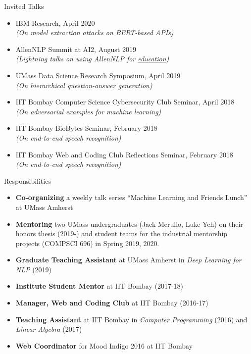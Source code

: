 \documentclass{resume} %
\begin{document}
\begin{rSection}{Invited Talks}
\vspace*{0.1in}
\begin{itemize}[leftmargin=*]
\item IBM Research, April 2020\\
\textit{(On model extraction attacks on BERT-based APIs)}
\item AllenNLP Summit at AI2, August 2019 \\
\textit{(Lightning talks on using AllenNLP for \href{https://github.com/martiansideofthemoon/allennlp-probe-hw}{education})}
\item UMass Data Science Research Symposium, April 2019 \\
\textit{(On hierarchical question-answer generation)}
\item IIT Bombay Computer Science Cybersecurity Club Seminar, April 2018 \\
\textit{(On adversarial examples for machine learning)}
\item IIT Bombay BioBytes Seminar, February 2018\\
\textit{(On end-to-end speech recognition)}
\item IIT Bombay Web and Coding Club Reflections Seminar, February 2018 \\
\textit{(On end-to-end speech recognition)}
\end{itemize}
\end{rSection}

\begin{rSection}{Responsibilities}
\vspace*{0.1in}
\begin{itemize}[leftmargin=*]
\item \textbf{Co-organizing} a weekly talk series ``Machine Learning and Friends Lunch'' at UMass Amherst
\item \textbf{Mentoring} two UMass undergraduates (Jack Merullo, Luke Yeh) on their honors thesis (2019-) and student teams for the industrial mentorship projects (COMPSCI 696) in Spring 2019, 2020.
\item \textbf{Graduate Teaching Assistant} at UMass Amherst in \textit{Deep Learning for NLP} (2019)
\item \textbf{Institute Student Mentor} at IIT Bombay (2017-18)
\item \textbf{Manager, Web and Coding Club} at IIT Bombay (2016-17)
\item \textbf{Teaching Assistant} at IIT Bombay in \textit{Computer Programming} (2016) and \textit{Linear Algebra} (2017)
\item \textbf{Web Coordinator} for Mood Indigo 2016 at IIT Bombay
\end{itemize}
\end{rSection}
\end{document}
